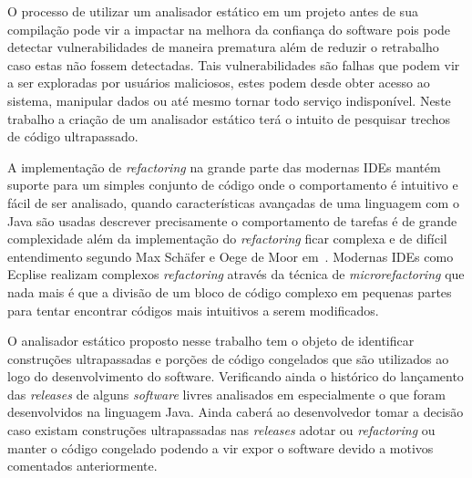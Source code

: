 O processo de utilizar um analisador estático em um projeto antes de sua compilação pode vir a impactar na melhora da confiança do software pois pode detectar vulnerabilidades de maneira prematura além de reduzir o retrabalho caso estas não fossem detectadas. Tais vulnerabilidades são falhas que podem vir a ser exploradas por usuários maliciosos, estes podem desde obter acesso ao sistema, manipular dados ou até mesmo tornar todo serviço indisponível. Neste trabalho a criação de um analisador estático terá o intuito de pesquisar trechos de código ultrapassado.

A implementa\c{c}\~{a}o de {\it refactoring} na grande parte das modernas IDEs mant\'{e}m suporte para um simples conjunto de c\'{o}digo onde o comportamento \'{e} intuitivo e f\'{a}cil de ser analisado,  quando caracter\'{i}sticas avan\c{c}adas de uma linguagem com o Java s\~{a}o usadas descrever precisamente o comportamento de tarefas \'{e} de grande complexidade al\'{e}m da implementa\c{c}\~{a}o do \textit{refactoring} ficar complexa e de dif\'{i}cil entendimento segundo Max Schäfer e Oege de Moor em~\cite{Schaefer:ACM2010}. Modernas IDEs como Ecplise realizam complexos \textit{refactoring} atrav\'{e}s da t\'{e}cnica de {\it microrefactoring} que nada mais \'{e} que a divis\~{a}o de um bloco de c\'{o}digo complexo em pequenas partes para tentar encontrar c\'{o}digos mais intuitivos a serem modificados.

O analisador est\'{a}tico proposto nesse trabalho tem o objeto de identificar constru\c{c}\~{o}es ultrapassadas e por\c{c}\~{o}es de c\'{o}digo congelados que s\~{a}o utilizados ao logo do desenvolvimento do software. Verificando ainda o hist\'{o}rico do lan\c{c}amento das {\it releases} de alguns {\it software} livres analisados em especialmente o que foram desenvolvidos na linguagem Java. Ainda caber\'{a} ao desenvolvedor tomar a decis\~{a}o caso existam constru\c{c}\~{o}es ultrapassadas nas \textit{releases} adotar ou {\it refactoring} ou manter o c\'{o}digo congelado podendo a vir expor o software devido a motivos comentados anteriormente.
